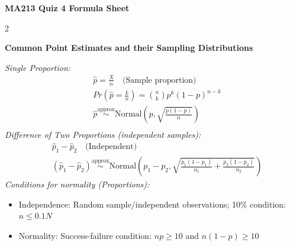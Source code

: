 \documentclass[8pt]{article}
\begin{document}
\begin{center}
    {\LARGE \textbf{MA213 Quiz 4 Formula Sheet}}
\end{center}

\vspace{1em}



\clearpage

\begin{multicols}{2} %

\textbf{Common Point Estimates and their Sampling Distributions}

\textit{Single Proportion:}
\begin{align*}
    &\hat{p} = \frac{X}{n} \quad \text{(Sample proportion)} \\
    &Pr\left(\hat{p}=\frac{k}{n}\right) = \binom{n}{k} p^k (1-p)^{n-k} \\
    &\hat{p} \stackrel{\text{approx}}{\sim} \text{Normal}\left(p, \sqrt{\frac{p(1-p)}{n}}\right) \\
\end{align*}
\textit{Difference of Two Proportions (independent samples):}
\begin{align*}
    &\hat{p}_1 - \hat{p}_2 \quad \text{(Independent)} \\
    &(\hat{p}_1 - \hat{p}_2) \stackrel{\text{approx}}{\sim} \text{Normal}\left(p_1 - p_2, \sqrt{\frac{p_1(1-p_1)}{n_1} + \frac{p_2(1-p_2)}{n_2}}\right)
\end{align*}
\textit{Conditions for normality (Proportions):}
\begin{itemize} 
    \item Independence: Random sample/independent observations; 10\% condition: $n \leq 0.1N$
    \item Normality: Success-failure condition: $np \ge 10$ and $n(1-p) \ge 10$
\end{itemize}




\end{multicols}
\end{document}
